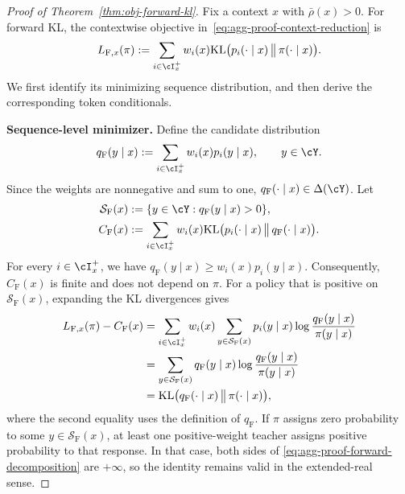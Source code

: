 \documentclass[11pt]{article}
\newcommand{\KL}{\text{KL}}
\begin{document}
\begin{proof}[Proof of Theorem~\ref{thm:obj-forward-kl}]
Fix a context $x$ with $\bar\rho(x)>0$. For forward KL, the
contextwise objective in~\eqref{eq:agg-proof-context-reduction} is
\begin{align*}
    L_{\mathrm F,x}(\pi)
    :=\sum_{i\in\cI_x^+}w_i(x)
    \KL\bigl(p_i(\cdot\mid x)\,\big\|\,\pi(\cdot\mid x)\bigr).
\end{align*}
We first identify its minimizing sequence distribution, and then
derive the corresponding token conditionals.

\textbf{Sequence-level minimizer.}
Define the candidate distribution
\begin{align*}
    q_{\mathrm F}(y\mid x)
    :=\sum_{i\in\cI_x^+}w_i(x)p_i(y\mid x),
    \qquad y\in\cY.
\end{align*}
Since the weights are nonnegative and sum to one,
$q_{\mathrm F}(\cdot\mid x)\in\Delta(\cY)$. Let
\begin{align*}
    \mathcal S_{\mathrm F}(x)
    &:=\{y\in\cY:q_{\mathrm F}(y\mid x)>0\},\\*
    C_{\mathrm F}(x)
    &:=\sum_{i\in\cI_x^+}w_i(x)
    \KL\bigl(p_i(\cdot\mid x)\,\big\|\,q_{\mathrm F}(\cdot\mid x)\bigr).
\end{align*}
For every $i\in\cI_x^+$, we have
$q_{\mathrm F}(y\mid x)\geq w_i(x)p_i(y\mid x)$. Consequently,
$C_{\mathrm F}(x)$ is finite and does not depend on $\pi$.
For a policy that is positive on $\mathcal S_{\mathrm F}(x)$,
expanding the KL divergences gives
\begin{align}
    L_{\mathrm F,x}(\pi)-C_{\mathrm F}(x)
    &=\sum_{i\in\cI_x^+}w_i(x)
      \sum_{y\in\mathcal S_{\mathrm F}(x)}
      p_i(y\mid x)
      \log\frac{q_{\mathrm F}(y\mid x)}{\pi(y\mid x)}\notag\\*
    &=\sum_{y\in\mathcal S_{\mathrm F}(x)}
      q_{\mathrm F}(y\mid x)
      \log\frac{q_{\mathrm F}(y\mid x)}{\pi(y\mid x)}\notag\\*
    &=\KL\bigl(q_{\mathrm F}(\cdot\mid x)
      \,\big\|\,\pi(\cdot\mid x)\bigr),
    \label{eq:agg-proof-forward-decomposition}
\end{align}
where the second equality uses the definition of $q_{\mathrm F}$.
If $\pi$ assigns zero probability to some
$y\in\mathcal S_{\mathrm F}(x)$, at least one positive-weight
teacher assigns positive probability to that response. In that
case, both sides of \eqref{eq:agg-proof-forward-decomposition} are
$+\infty$, so the identity remains valid in the extended-real sense.


\end{proof}
\end{document}
